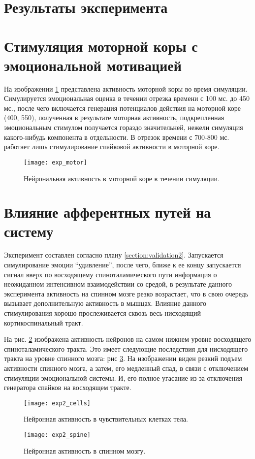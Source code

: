 \section{Результаты эксперимента}
\section{Стимуляция моторной коры с эмоциональной мотивацией}
На изображении \ref{fig:exp_motor} представлена активность моторной коры во время симуляции. 
Симулируется эмоциональная оценка в течении отрезка времени с 100 мс. до 450 мс., после чего включается генерация потенциалов действия на моторной коре (400, 550), полученная в результате моторная активность, подкрепленная эмоциональным стимулом получается гораздо значительней, нежели симуляция какого-нибудь компонента в отдельности. В отрезок времени с 700-800 мс. работает лишь стимулирование спайковой активности в моторной коре.

\begin{figure}
	\centering
	\texttt{[image: exp\_motor]}
	\caption{Нейрональная активность в моторной коре в течении симуляции.}
	\label{fig:exp_motor}
\end{figure}

\section{Влияние афферентных путей на систему}
Эксперимент составлен согласно плану \ref{section:validation2}.
Запускается симулирование эмоции \enquote{удивление}, после чего, ближе к ее концу запускается сигнал вверх по восходящему спиноталамического пути информация о неожиданном интенсивном взаимодействии со средой, в результате данного эксперимента активность на спинном мозге резко возрастает, что в свою очередь вызывает дополнительную активность в мышцах.
Влияние данного стимулирования хорошо прослеживается сквозь весь нисходящий кортикоспинальный тракт.

На рис. \ref{fig:exp2_cells} изображена активность нейронов на самом нижнем уровне восходящего спиноталамического тракта.
Это имеет следующие последствия для нисходящего тракта на уровне спинного мозга: рис \ref{fig:exp2_spine}. На изображении виден резкий подъем активности спинного мозга, а затем, его медленный спад, в связи с отключением стимуляции эмоциональной системы. И, его полное угасание из-за отключения генератора спайков на восходящем тракте.

\begin{figure}
	\centering
	\texttt{[image: exp2\_cells]}
	\caption{Нейронная активность в чувствительных клетках тела.}
	\label{fig:exp2_cells}
\end{figure}
\begin{figure}
	\centering
	\texttt{[image: exp2\_spine]}
	\caption{Нейронная активность в спинном мозгу.}
	\label{fig:exp2_spine}
\end{figure}